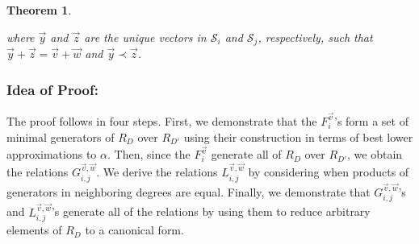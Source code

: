 \documentclass{amsart}
\theoremstyle{plain}
\newtheorem{thm}{Theorem}[section]
\theoremstyle{definition}
\theoremstyle{remark}
\numberwithin{equation}{section}
\newcommand\sssec{\subsubsection}
\newcommand\mss{\mathscr{S}}
\begin{document}
\begin{thm}
\begin{enumerate}
\end{enumerate}

\noindent
where $\vec{y}$ and $\vec{z}$ are the unique
vectors in $\mss_i$ and $\mss_j$, respectively, such that $\vec{y}
+ \vec{z} = \vec{v} + \vec{w}$ and $\vec{y} \prec \vec{z}$.
\end{thm}

\sssec*{Idea of Proof:}
The proof follows in four steps. First, we demonstrate that
the $F_{i}^{\vec{v}}$'s form a set of minimal generators of $R_D$
over $R_{D'}$ using their construction in terms of best lower
approximations to $\alpha$. Then, since the $F_{i}^{\vec{v}}$ generate
all of $R_D$ over $R_{D'}$, we obtain the
relations $G_{i, j}^{\vec{v}, \vec{w}}$.
We derive the relations
$L_{i, j}^{\vec{v}, \vec{w}}$ by considering when products of
generators in neighboring degrees are equal. Finally, we demonstrate
that $G_{i, j}^{\vec{v}, \vec{w}}$'s and $L_{i, j}^{\vec{v}, \vec{w}}$'s
generate all of the relations by using them to reduce arbitrary
elements of
$R_D$ to a canonical form.
\end{document}
